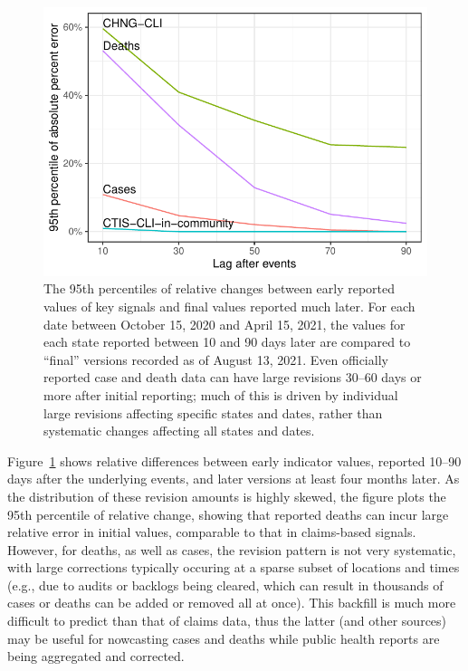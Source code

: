 \documentclass[9pt,twocolumn,twoside,lineno]{pnas-new}
\begin{document}
\begin{figure}[t]
  \includegraphics[width=\columnwidth]{fig/backfill-compare.pdf}
  \caption{The 95th percentiles of relative changes between early reported
    values of key signals and final values reported much later. For each date
    between October 15, 2020 and April 15, 2021, the values for each state
    reported between 10 and 90 days later are compared to ``final'' versions
    recorded as of August 13, 2021. Even officially reported case and death data
    can have large revisions 30--60 days or more after initial reporting; much
    of this is driven by individual large revisions affecting specific states
    and dates, rather than systematic changes affecting all states and dates.} 
  \label{fig:backfill-compare}
\end{figure}

Figure~\ref{fig:backfill-compare} shows relative differences between early
indicator values, reported 10--90 days after the underlying events, and later 
versions at least four months later. As the distribution of these revision
amounts is highly skewed, the figure plots the 95th percentile of relative
change, showing that reported deaths can incur large relative error in initial
values, comparable to that in claims-based signals.  However, for deaths, as
well as cases, the revision pattern is not very systematic, with large
corrections typically occuring at a sparse subset of locations and times
(e.g., due to audits or backlogs being cleared, which can result in thousands of
cases or deaths can be  added or removed all at once).  This backfill is much
more difficult to predict than that of claims data, thus the latter (and other 
sources) may be useful for nowcasting cases and deaths while public health 
reports are being aggregated and corrected.   
\end{document}
